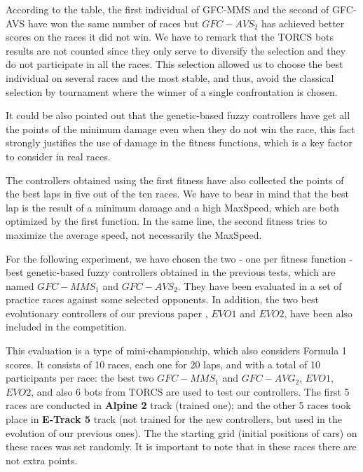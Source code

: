 \documentclass[conference]{IEEEtran}
\begin{document}
According to the table, the first individual of GFC-MMS and the second of GFC-AVS have won the same number of races but $GFC-AVS_2$ has achieved better scores on the races it did not win.
We have to remark that the TORCS bots results are not counted since they only serve to diversify the selection and they do not participate in all the races.
This selection allowed us to choose the best individual on several races and the most stable, and thus, avoid the classical selection by tournament where the winner of a single confrontation is chosen.

It could be also pointed out that the genetic-based fuzzy controllers have get all the points of the minimum damage even when they do not win the race, this fact strongly justifies the use of damage in the fitness functions, which is a key factor to consider in real races.

The controllers obtained using the first fitness have also collected the points of the best laps in five out of the ten races. We have to bear in mind that the best lap is the result of a minimum damage and a high MaxSpeed, which are both optimized by the first function. In the same line, the second fitness tries to maximize the average speed, not necessarily the MaxSpeed.

For the following experiment, we have chosen the two - one per fitness function - best genetic-based fuzzy controllers obtained in the previous tests, which are named $GFC-MMS_1$ and $GFC-AVS_2$. They have been evaluated in a set of practice races against some selected opponents. In addition, the two best evolutionary controllers of our previous paper \cite{evo18}, $EVO1$ and $EVO2$, have been also included in the competition.

This evaluation is a type of mini-championship, which also considers Formula 1 scores. It consists of 10 races, each one for 20 laps, and with a total of 10 participants per race: the best two $GFC-MMS_1$ and $GFC-AVG_2$, $EVO1$, $EVO2$, and also 6 bots from TORCS are used to test our controllers. The first 5 races are conducted in \textbf{Alpine 2} track (trained one); and the other 5 races took place in \textbf{E-Track 5} track (not trained for the new controllers, but used in the evolution of our previous ones). The the starting grid (initial positions of cars) on these races was set randomly.
It is important to note that in these races there are not extra points.
\end{document}

